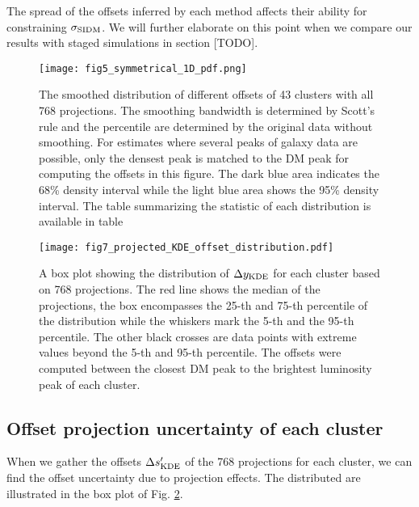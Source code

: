 The spread of the offsets inferred by each method affects their ability
for constraining $\sigma_{\rm SIDM}$. We will further elaborate on this point
when we compare our results with staged simulations in section [TODO]. 

\begin{figure*}
	\begin{center}
	\texttt{[image: fig5\_symmetrical\_1D\_pdf.png]}
	\caption{ 		
		The smoothed distribution of different offsets of 43 clusters with all 768
		projections. The smoothing bandwidth is determined by Scott's rule
		and the percentile are determined by the original data without smoothing.
		For estimates where several peaks of galaxy data are 
		possible, only the densest peak is matched to the DM peak for computing
		the offsets in this figure. 
		The dark blue area indicates the 68\% density interval
		while the light blue area shows the 95\% density interval. 
		The table summarizing the statistic of each distribution is available in
		table 
		\label{fig:offset_distributions}
	}
\end{center}
\end{figure*}

\begin{figure*}
	\begin{center}
	\texttt{[image: fig7\_projected\_KDE\_offset\_distribution.pdf]}
	\caption{A box plot showing the distribution of $\Delta y_{\rm KDE}$ for each cluster 
		based on 768 projections. The red line shows the median of the projections,
		the box encompasses the 25-th and 75-th percentile of the distribution while
		the whiskers mark the 5-th and the 95-th percentile. The other black crosses
		are data points with extreme values beyond the 5-th and 95-th percentile.
		The offsets were computed between the closest DM 
		peak to the brightest luminosity peak of each cluster. 		
		\label{fig:projected_KDE_offset_distribution}
	}
\end{center}
\end{figure*}

\subsection{Offset projection uncertainty of each cluster}
When we gather the offsets $\Delta s_{\rm KDE}'$ of the 
768 projections for each cluster,
we can find the offset uncertainty due to projection effects.
The distributed are illustrated in the box plot of Fig. 
\ref{fig:projected_KDE_offset_distribution}.

